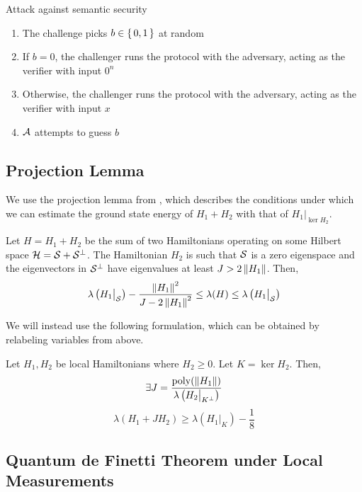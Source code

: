 \begin{definition} [$\BQP$]
\begin{protocol}{Attack against semantic security}
	\label{proto:indcpa}
	\begin{enumerate}
		\item The challenge picks $b\in\set{0,1}$ at random
		\item If $b=0$, the challenger runs the protocol with the adversary, acting as the verifier with input $0^n$
		\item Otherwise, the challenger runs the protocol with the adversary, acting as the verifier with input $x$
		\item $\mathcal{A}$ attempts to guess $b$
	\end{enumerate}
\end{protocol}

\subsection{Projection Lemma}

We use the projection lemma from \cite{kempe_kitaev_regev_2006}, which describes the conditions under which we can estimate the ground state energy of $H_1 + H_2$ with that of $H_1\big|_{\ker H_2}$.

\begin{thm}
	Let $H=H_1+H_2$ be the sum of two Hamiltonians operating on some Hilbert space $\mathcal{H}=\mathcal{S}+\mathcal{S}^\bot$.
	The Hamiltonian $H_2$ is such that $\mathcal{S}$ is a zero eigenspace and the eigenvectors in $\mathcal{S}^\bot$ have eigenvalues at least $J>2\left\lVert H_1\right\rVert$. Then,
	$$\lambda\left(H_1\big|_{\mathcal{S}}\right)-\frac{\left\lVert H_1\right\rVert^2}{J-2\left\lVert H_1\right\rVert^2}\leq\lambda(H)\leq\lambda\left(H_1\big|_{\mathcal{S}}\right)$$
\end{thm}

We will instead use the following formulation, which can be obtained by relabeling variables from above.

\begin{thm}
	\label{thm:projection}
	Let $H_1, H_2$ be local Hamiltonians where $H_2\geq0$. Let $K=\ker H_2$. Then,
	$$\exists J=\frac{\operatorname*{\operatorname{poly}}(\left\lVert H_1\right\rVert)}{\lambda\left(H_2\big|_{K^\bot}\right)}$$
	$$\lambda(H_1+JH_2)\geq\lambda\left(H_1\big|_K\right)-\frac{1}{8}$$
\end{thm}

\subsection{Quantum de Finetti Theorem under Local Measurements}


\end{definition}
